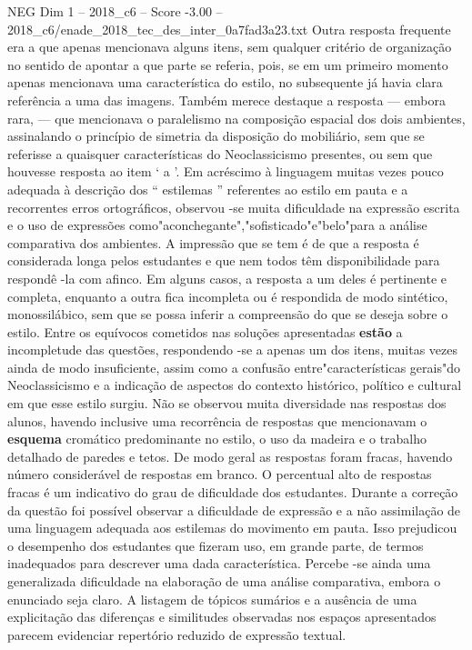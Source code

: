\begin{textsample}{NEG Dim 1 – 2018\_c6 – Score -3.00 – 2018\_c6/enade\_2018\_tec\_des\_inter\_0a7fad3a23.txt}
Outra resposta frequente era a que apenas mencionava alguns itens, sem qualquer critério de organização no sentido de apontar a que parte se referia, pois, se em um primeiro momento apenas mencionava uma característica do estilo, no subsequente já havia clara referência a uma das imagens.
Também merece destaque a resposta — embora rara, — que mencionava o paralelismo na composição espacial dos dois ambientes, assinalando o princípio de simetria da disposição do mobiliário, sem que se referisse a quaisquer características do Neoclassicismo presentes, ou sem que houvesse resposta ao item ‘ a ’.
Em acréscimo à linguagem muitas vezes pouco adequada à descrição dos “ estilemas ” referentes ao estilo em pauta e a recorrentes erros ortográficos, observou -se muita dificuldade na expressão escrita e o uso de expressões como"aconchegante","sofisticado"e"belo"para a análise comparativa dos ambientes.
A impressão que se tem é de que a resposta é considerada longa pelos estudantes e que nem todos têm disponibilidade para respondê -la com afinco.
Em alguns casos, a resposta a um deles é pertinente e completa, enquanto a outra fica incompleta ou é respondida de modo sintético, monossilábico, sem que se possa inferir a compreensão do que se deseja sobre o estilo.
Entre os equívocos cometidos nas soluções apresentadas \textbf{estão} a incompletude das questões, respondendo -se a apenas um dos itens, muitas vezes ainda de modo insuficiente, assim como a confusão entre"características gerais"do Neoclassicismo e a indicação de aspectos do contexto histórico, político e cultural em que esse estilo surgiu.
Não se observou muita diversidade nas respostas dos alunos, havendo inclusive uma recorrência de respostas que mencionavam o \textbf{esquema} cromático predominante no estilo, o uso da madeira e o trabalho detalhado de paredes e tetos.
De modo geral as respostas foram fracas, havendo número considerável de respostas em branco.
O percentual alto de respostas fracas é um indicativo do grau de dificuldade dos estudantes.
Durante a correção da questão foi possível observar a dificuldade de expressão e a não assimilação de uma linguagem adequada aos estilemas do movimento em pauta.
Isso prejudicou o desempenho dos estudantes que fizeram uso, em grande parte, de termos inadequados para descrever uma dada característica.
Percebe -se ainda uma generalizada dificuldade na elaboração de uma análise comparativa, embora o enunciado seja claro.
A listagem de tópicos sumários e a ausência de uma explicitação das diferenças e similitudes observadas nos espaços apresentados parecem evidenciar repertório reduzido de expressão textual.

\end{textsample}
